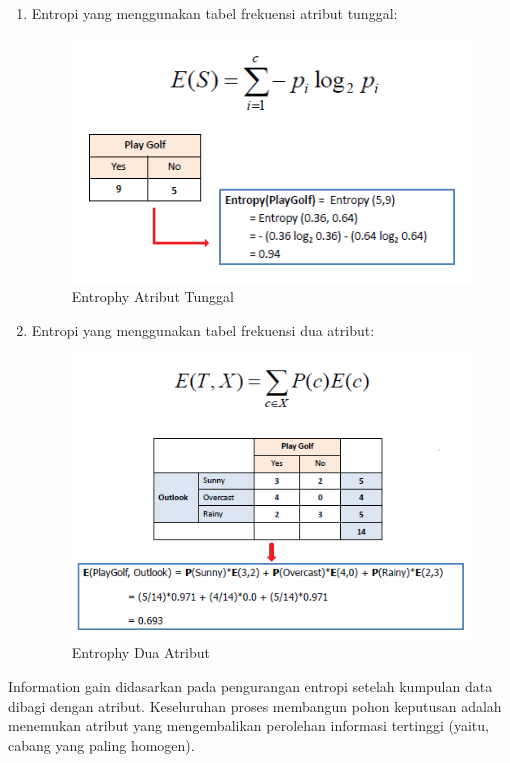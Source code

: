 \begin{enumerate}
    \item Entropi yang menggunakan tabel frekuensi atribut tunggal:
    \begin{figure}[H]
        \centering
        \includegraphics[width=12cm]{figures/chapter2/10.png}
        \caption{Entrophy Atribut Tunggal}
    \end{figure}
    \item Entropi yang menggunakan tabel frekuensi dua atribut:
    \begin{figure}[H]
        \centering
        \includegraphics[width=12cm]{figures/chapter2/11.png}
        \caption{Entrophy Dua Atribut}
    \end{figure}
\end{enumerate}

\par Information gain didasarkan pada pengurangan entropi setelah kumpulan data dibagi dengan atribut. Keseluruhan proses membangun pohon keputusan adalah menemukan atribut yang mengembalikan perolehan informasi tertinggi (yaitu, cabang yang paling homogen).

